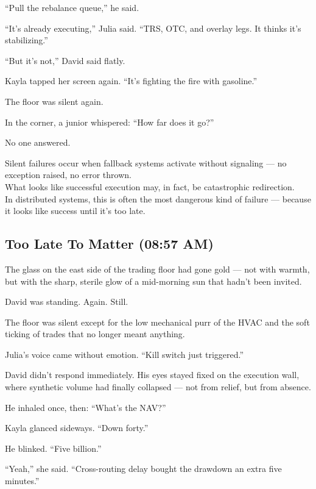 “Pull the rebalance queue,” he said.

“It’s already executing,” Julia said. “TRS, OTC, and overlay legs. It thinks it's stabilizing.”

“But it’s not,” David said flatly.

Kayla tapped her screen again. “It’s fighting the fire with gasoline.”

The floor was silent again.

In the corner, a junior whispered: “How far does it go?”

No one answered.

\medskip

\begin{tcolorbox}[title=Silent Failure Modes, colback=gray!5, colframe=black]
Silent failures occur when fallback systems activate without signaling — no exception raised, no error thrown.\\
What looks like successful execution may, in fact, be catastrophic redirection.\\
In distributed systems, this is often the most dangerous kind of failure — because it looks like success until it’s too late.
\end{tcolorbox}

\medskip

\subsection{Too Late To Matter (08:57 AM)} 

The glass on the east side of the trading floor had gone gold — not with warmth, but with the sharp, 
sterile glow of a mid-morning sun that hadn’t been invited.

David was standing. Again. Still.

The floor was silent except for the low mechanical purr of the HVAC and the soft ticking of trades 
that no longer meant anything.

Julia's voice came without emotion. “Kill switch just triggered.”

David didn’t respond immediately. His eyes stayed fixed on the execution wall, where synthetic 
volume had finally collapsed — not from relief, but from absence.

He inhaled once, then: “What’s the NAV?”

Kayla glanced sideways. “Down forty.”

He blinked. “Five billion.”

“Yeah,” she said. “Cross-routing delay bought the drawdown an extra five minutes.”


